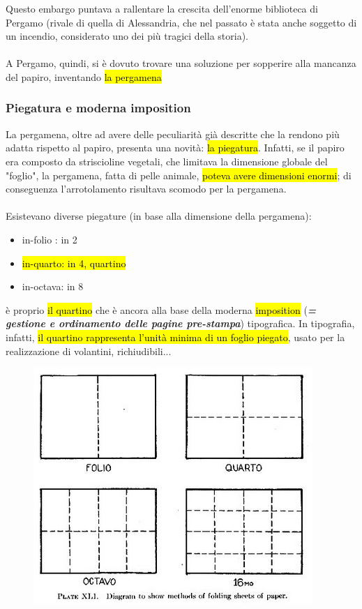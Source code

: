 Questo embargo puntava a rallentare la crescita dell'enorme biblioteca di Pergamo (rivale di quella di Alessandria, che nel passato è stata anche soggetto di un incendio, considerato uno dei più tragici della storia).
\\\\
A Pergamo, quindi, si è dovuto trovare una soluzione per sopperire alla mancanza del papiro, inventando \hl{la pergamena}

\subsubsection{Piegatura e moderna imposition}
La pergamena, oltre ad avere delle peculiarità già descritte che la rendono più adatta rispetto al papiro, presenta una novità: \hl{la piegatura}. Infatti, se il papiro era composto da striscioline vegetali, che limitava la dimensione globale del "foglio", la pergamena, fatta di pelle animale, \hl{poteva avere dimensioni enormi}; di conseguenza l'arrotolamento risultava scomodo per la pergamena.
\\\\
Esistevano diverse piegature (in base alla dimensione della pergamena):
\begin{itemize}
    \item in-folio : in 2
    \item \hl{in-quarto: in 4, quartino}
    \item in-octava: in 8
\end{itemize}
è proprio \hl{il quartino} che è ancora alla base della moderna \hl{imposition} (\textbf{\textit{= gestione e ordinamento delle pagine pre-stampa}}) tipografica.
In tipografia, infatti, \hl{il quartino rappresenta l'unità minima di un foglio piegato}, usato per la realizzazione di volantini, richiudibili...
\begin{figure}[H]
    \centering
    \includegraphics[width=0.5\linewidth]{lezione_3/imgs/Plate41_Printed Book Sheet.jpg}
\end{figure}